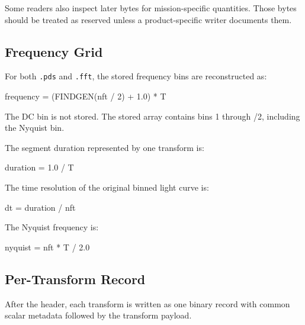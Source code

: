 Some readers also inspect later  bytes for mission-specific
quantities.  Those bytes should be treated as reserved unless a
product-specific writer documents them.

\subsection{Frequency Grid}

For both \texttt{.pds} and \texttt{.fft}, the stored frequency bins are
reconstructed as:

\begin{ghatsconsole}
frequency = (FINDGEN(nft / 2) + 1.0) * T
\end{ghatsconsole}

The DC bin is not stored.  The stored array contains bins 1 through
/2, including the Nyquist bin.

The segment duration represented by one transform is:

\begin{ghatsconsole}
duration = 1.0 / T
\end{ghatsconsole}

The time resolution of the original binned light curve is:

\begin{ghatsconsole}
dt = duration / nft
\end{ghatsconsole}

The Nyquist frequency is:

\begin{ghatsconsole}
nyquist = nft * T / 2.0
\end{ghatsconsole}

\subsection{Per-Transform Record}

After the header, each transform is written as one binary record with common
scalar metadata followed by the transform payload.

